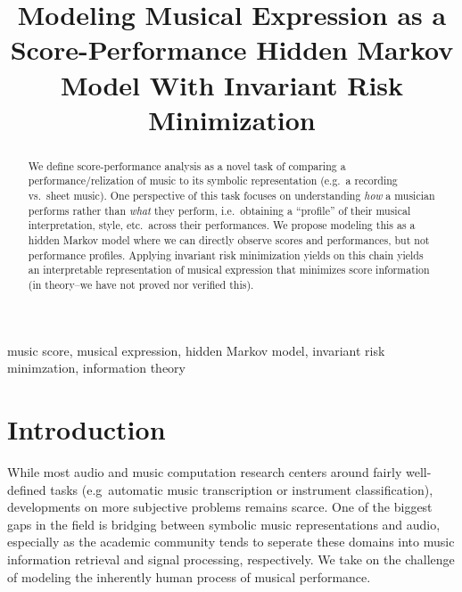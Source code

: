 \documentclass[conference]{IEEEtran}
\begin{document}
\title{Modeling Musical Expression as a Score-Performance Hidden Markov Model With Invariant Risk Minimization}

\author{
}

\maketitle

\begin{abstract}
    We define score-performance analysis as a novel task of comparing a performance/relization of music to its symbolic representation (e.g.\ a recording vs.\ sheet music). One perspective of this task focuses on understanding \textit{how} a musician performs rather than \textit{what} they perform, i.e.\ obtaining a ``profile'' of their musical interpretation, style, etc.\ across their performances. We propose modeling this as a hidden Markov model where we can directly observe scores and performances, but not performance profiles. Applying invariant risk minimization yields on this chain yields an interpretable representation of musical expression that minimizes score information (in theory–we have not proved nor verified this).
\end{abstract}

\begin{IEEEkeywords}
    music score, musical expression, hidden Markov model, invariant risk minimzation, information theory
\end{IEEEkeywords}

\section{Introduction}
While most audio and music computation research centers around fairly well-defined tasks (e.g\ automatic music transcription or instrument classification), developments on more subjective problems remains scarce. One of the biggest gaps in the field is bridging between symbolic music representations and audio, especially as the academic community tends to seperate these domains into music information retrieval and signal processing, respectively. We take on the challenge of modeling the inherently human process of musical performance. \parencite{Cacino-Chacon}
\end{document}
